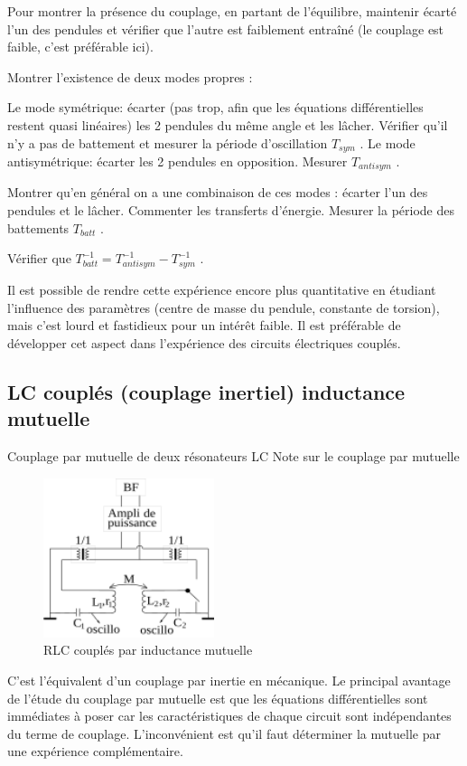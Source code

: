 \documentclass{article}%
\begin{document}
Pour montrer la présence du couplage, en partant de l'équilibre, maintenir écarté l'un des pendules et vérifier que l'autre est faiblement entraîné (le couplage est faible, c'est préférable ici).

Montrer l'existence de deux modes propres :

    Le mode symétrique: écarter (pas trop, afin que les équations différentielles restent quasi linéaires) les 2 pendules du même angle et les lâcher. Vérifier qu'il n'y a pas de battement et mesurer la période d'oscillation $T_{sym}$ .
    Le mode antisymétrique: écarter les 2 pendules en opposition. Mesurer $T_{antisym}$ .

Montrer qu'en général on a une combinaison de ces modes : écarter l'un des pendules et le lâcher. Commenter les transferts d'énergie. Mesurer la période des battements $T_{batt}$ .

Vérifier que $T^{-1}_{batt} = T^{-1}_{antisym} - T^{-1}_{sym}$ .

Il est possible de rendre cette expérience encore plus quantitative en étudiant l'influence des paramètres (centre de masse du pendule, constante de torsion), mais c'est lourd et fastidieux pour un intérêt faible. Il est préférable de développer cet aspect dans l'expérience des circuits électriques couplés. 

\subsection{LC couplés (couplage inertiel) inductance mutuelle}

Couplage par mutuelle de deux résonateurs LC
Note sur le couplage par mutuelle
\begin{figure}
	\centerline{\includegraphics[width=5cm]{images-exp/RLCMCouples.png}}
	\caption{RLC couplés par inductance mutuelle}
\end{figure}

C'est l'équivalent d'un couplage par inertie en mécanique. Le principal avantage de l'étude du couplage par mutuelle est que les équations différentielles sont immédiates à poser car les caractéristiques de chaque circuit sont indépendantes du terme de couplage. L'inconvénient est qu'il faut déterminer la mutuelle par une expérience complémentaire.
\end{document}
